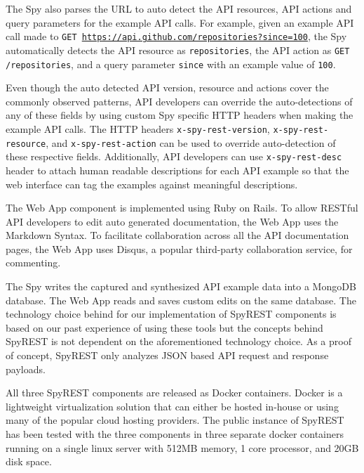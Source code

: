 \documentclass[conference]{IEEEtran}
\begin{document}
The Spy also parses the URL to auto detect the API resources, API actions and query parameters for the example API calls. For example, given an example API call made to \texttt{GET \url{https://api.github.com/repositories?since=100}}, the Spy automatically detects the API resource as \texttt{repositories}, the API action as \texttt{GET /repositories}, and a query parameter \texttt{since} with an example value of \texttt{100}.

Even though the auto detected API version, resource and actions cover the commonly observed patterns, API developers can override the auto-detections of any of these fields by using custom Spy specific HTTP headers when making the example API calls. The HTTP headers \texttt{x-spy-rest-version}, \texttt{x-spy-rest-resource}, and \texttt{x-spy-rest-action} can be used to override auto-detection of these respective fields. Additionally, API developers can use \texttt{x-spy-rest-desc} header to attach human readable descriptions for each API example so that the web interface can tag the examples against meaningful descriptions.

The Web App component is implemented using Ruby on Rails. To allow RESTful API developers to edit auto generated documentation, the Web App uses the Markdown Syntax. To facilitate collaboration across all the API documentation pages, the Web App uses Disqus, a popular third-party collaboration service, for commenting.

The Spy writes the captured and synthesized API example data into a MongoDB database. The Web App reads and saves custom edits on the same database. The technology choice behind for our implementation of SpyREST components is based on our past experience of using these tools but the concepts behind SpyREST is not dependent on the aforementioned technology choice. As a proof of concept, SpyREST only analyzes JSON based API request and response payloads.

All three SpyREST components are released as Docker containers. Docker is a lightweight virtualization solution that can either be hosted in-house or using many of the popular cloud hosting providers. The public instance of SpyREST has been tested with the three components in three separate docker containers running on a single linux server with 512MB memory, 1 core processor, and 20GB disk space.
\end{document}
